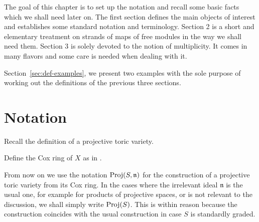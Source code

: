 \documentclass[fleqn,reqno]{amsart}
\begin{document}



\begin{paragraf*}
The goal of this chapter is to set up the notation and recall some basic facts
which we shall need later on.
The first section defines the main objects of interest and establishes some
standard notation and terminology.
Section 2 is a short and elementary treatment on strands of maps of free modules
in the way we shall need them.
Section 3 is solely devoted to the notion of multiplicity.
It comes in many flavors and some care is needed when dealing with it.
\end{paragraf*}

\begin{paragraf*}
Section~\ref{sec:def-examples}, we present two examples with the sole purpose
of working out the definitions of the previous three sections.
\end{paragraf*}



\section{Notation}
\label{sec:notation}

\begin{paragraf}
\label{par:toric-variety}
Recall the definition of a projective toric variety.
\end{paragraf}

\begin{paragraf}
\label{par:cox-ring}
Define the Cox ring of $X$ as in \citet{Cox-93}.
\end{paragraf}

\begin{paragraf}
From now on we use the notation $\operatorname{Proj}(S,\mathfrak n)$ for the construction of a projective toric variety from
its Cox ring. In the cases where the irrelevant ideal $\mathfrak n$ is the usual one,
for example for products of projective spaces, or is not relevant to the discussion,
we shall simply write $\operatorname{Proj}(S)$.
This is within reason because the construction coincides with the usual construction
in case $S$ is standardly graded.
\end{paragraf}
\end{document}
